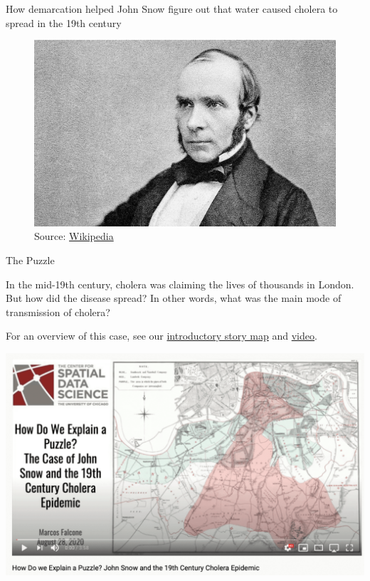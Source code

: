 \documentclass[
]{book}
\begin{document}
How demarcation helped John Snow figure out that water caused cholera to spread in the 19th century

\begin{figure}
\centering
\includegraphics{images/snow1.jpg}
\caption{Source: \href{https://en.wikipedia.org/wiki/John_Snow\#/media/File:John_Snow.jpg}{Wikipedia}}
\end{figure}

The Puzzle

In the mid-19th century, cholera was claiming the lives of thousands in London. But how did the disease spread? In other words, what was the main mode of transmission of cholera?

For an overview of this case, see our \href{https://uploads.knightlab.com/storymapjs/a0d512bc2bc17977f1029fedead0329a/trying-out/draft.html}{introductory story map} and \href{https://youtu.be/lGN8SK1Y1h4}{video}.

\includegraphics{images/snow2.png}
\end{document}
